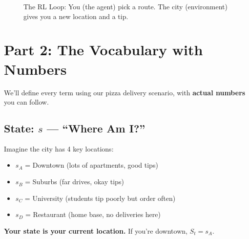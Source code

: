 \documentclass[journal, onecolumn]{IEEEtran}
\begin{document}
\begin{figure}[H]
    \centering
    \caption{The RL Loop: You (the agent) pick a route. The city (environment) gives you a new location and a tip.}
    \label{fig:rl_loop}
\end{figure}

\newpage
\section{Part 2: The Vocabulary with Numbers}

We'll define every term using our pizza delivery scenario, with \textbf{actual numbers} you can follow.

\subsection{State: $s$ --- ``Where Am I?''}

\begin{tcolorbox}[examplebox={Pizza Delivery Map}]
Imagine the city has 4 key locations:
\begin{itemize}
    \item $s_A$ = Downtown (lots of apartments, good tips)
    \item $s_B$ = Suburbs (far drives, okay tips)
    \item $s_C$ = University (students tip poorly but order often)
    \item $s_D$ = Restaurant (home base, no deliveries here)
\end{itemize}
\textbf{Your state is your current location.} If you're downtown, $S_t = s_A$.
\end{tcolorbox}
\end{document}
